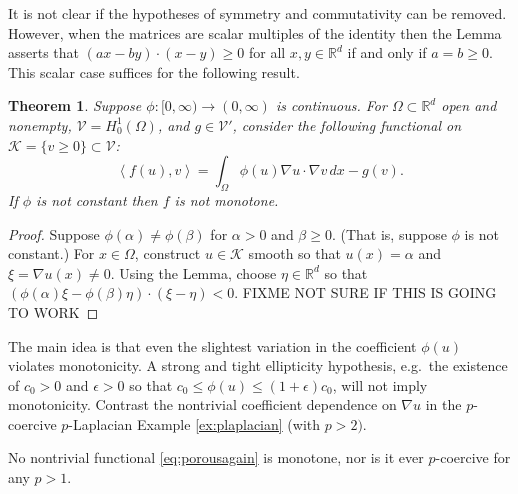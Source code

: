 \documentclass[letterpaper,final,12pt,reqno]{amsart}
\theoremstyle{cstyle}
\newtheorem{theorem}{Theorem}
\theoremstyle{cstyle*}
\theoremstyle{dstyle}
\numberwithin{equation}{section}
\numberwithin{figure}{section}
\numberwithin{table}{section}
\numberwithin{theorem}{section}
\newcommand{\eps}{\epsilon}
\newcommand{\RR}{\mathbb{R}}
\newcommand{\grad}{\nabla}
\newcommand{\cK}{\mathcal{K}}
\newcommand{\cV}{\mathcal{V}}
\newcommand{\ip}[2]{\left<#1,#2\right>}
\begin{document}
It is not clear if the hypotheses of symmetry and commutativity can be removed.  However, when the matrices are scalar multiples of the identity then the Lemma asserts that $(ax-by)\cdot(x-y) \ge 0$ for all $x,y\in\RR^d$ if and only if $a=b\ge 0$.  This scalar case suffices for the following result.

\begin{theorem}
Suppose $\phi:[0,\infty) \to (0,\infty)$ is continuous.  For $\Omega \subset \RR^d$ open and nonempty, $\cV = H_0^1(\Omega)$, and $g\in \cV'$, consider the following functional on $\cK = \{v\ge 0\} \subset \cV$:
\begin{equation}
\ip{f(u)}{v} = \int_\Omega \phi(u) \grad u\cdot \grad v\,dx - g(v).  \label{eq:porousagain}
\end{equation}
If $\phi$ is not constant then $f$ is not monotone.
\end{theorem}

\begin{proof}
Suppose $\phi(\alpha)\ne \phi(\beta)$ for $\alpha > 0$ and $\beta \ge 0$.  (That is, suppose $\phi$ is not constant.)  For $x\in\Omega$, construct $u\in \cK$ smooth so that $u(x)=\alpha$ and $\xi = \grad u(x) \ne 0$.  Using the Lemma, choose $\eta \in \RR^d$ so that $(\phi(\alpha) \xi - \phi(\beta) \eta) \cdot (\xi - \eta) < 0$.  FIXME NOT SURE IF THIS IS GOING TO WORK
\end{proof}

The main idea is that even the slightest variation in the coefficient $\phi(u)$ violates monotonicity.  A strong and tight ellipticity hypothesis, e.g.~the existence of $c_0>0$ and $\eps>0$ so that $c_0 \le \phi(u) \le (1+\eps)c_0$, will not imply monotonicity.  Contrast the nontrivial coefficient dependence on $\grad u$ in the $p$-coercive $p$-Laplacian Example \ref{ex:plaplacian} (with $p>2)$.

No nontrivial functional \eqref{eq:porousagain} is monotone, nor is it ever $p$-coercive for any $p>1$.
\end{document}
